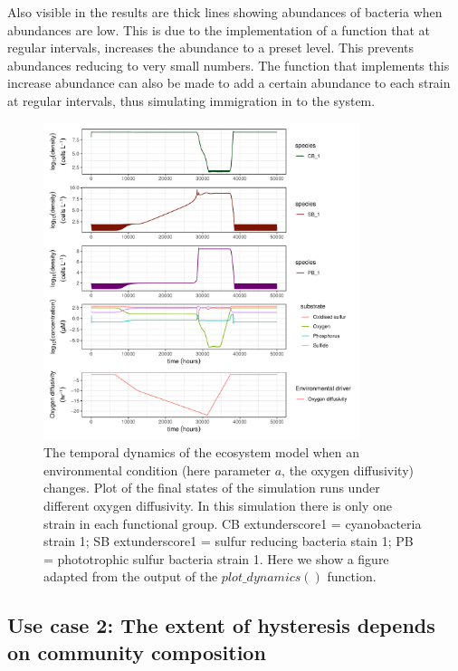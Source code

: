 \documentclass[]{elsarticle} %
\begin{document}
Also visible in the results are thick lines showing abundances of bacteria when abundances are low. This is due to the implementation of a function that at regular intervals, increases the abundance to a preset level. This prevents abundances reducing to very small numbers. The function that implements this increase abundance can also be made to add a certain abundance to each strain at regular intervals, thus simulating immigration in to the system.

\begin{figure}

{\centering \includegraphics[width=350px]{../figures/gen_uc1_partrep_temporal_state_switching} 

}

\caption{The temporal dynamics of the ecosystem model when an environmental condition (here parameter $a$, the oxygen diffusivity) changes. Plot of the final states of the simulation runs under different oxygen diffusivity. In this simulation there is only one strain in each functional group. CB    extunderscore1 = cyanobacteria strain 1; SB extunderscore1 = sulfur reducing bacteria stain 1; PB = phototrophic sulfur bacteria strain 1. Here we show a figure adapted from the output of the $plot\_dynamics()$  function.}\label{fig:uc1}
\end{figure}

\subsection{Use case 2: The extent of hysteresis depends on community composition}\label{use-case-2-the-extent-of-hysteresis-depends-on-community-composition}
\end{document}

